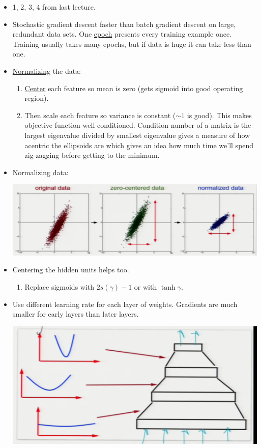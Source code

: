 \documentclass[10pt]{article}
\begin{document}
\begin{itemize}
	\item 1, 2, 3, 4 from last lecture.
	\item Stochastic gradient descent faster than batch gradient descent on large, redundant data sets. One \underline{epoch} presents every training example once. Training usually takes many epochs, but if data is huge it can take less than one.
	\item \underline{Normalizing} the data:
		\begin{enumerate}
			\item \underline{Center} each feature so mean is zero (gets sigmoid into good operating region).
			\item Then scale each feature so variance is constant ($\sim 1$ is good). This makes objective function well conditioned. Condition number of a matrix is the largest eigenvalue divided by smallest eigenvalue gives a measure of how acentric the ellipsoids are which gives an idea how much time we'll spend zig-zagging before getting to the minimum.
		\end{enumerate}
	\item Normalizing data:
		\begin{center}
			\includegraphics[scale=0.7]{../images/centereddata}
		\end{center}
	\item Centering the hidden units helps too.
		\begin{enumerate}
			\item Replace sigmoids with $2s(\gamma) - 1$ or with $\tanh \gamma$.
		\end{enumerate}
	\item Use different learning rate for each layer of weights. Gradients are much smaller for early layers than later layers.
		\begin{center}
			\includegraphics[scale=0.6]{../images/layerdifference}

\end{center}
\end{itemize}
\end{document}
